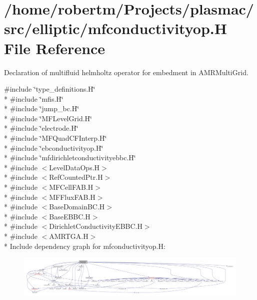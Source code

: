 \hypertarget{mfconductivityop_8H}{}\section{/home/robertm/\+Projects/plasmac/src/elliptic/mfconductivityop.H File Reference}
\label{mfconductivityop_8H}


Declaration of multifluid helmholtz operator for embedment in A\+M\+R\+Multi\+Grid.  


{\ttfamily \#include \char`\"{}type\+\_\+definitions.\+H\char`\"{}}\\*
{\ttfamily \#include \char`\"{}mfis.\+H\char`\"{}}\\*
{\ttfamily \#include \char`\"{}jump\+\_\+bc.\+H\char`\"{}}\\*
{\ttfamily \#include \char`\"{}M\+F\+Level\+Grid.\+H\char`\"{}}\\*
{\ttfamily \#include \char`\"{}electrode.\+H\char`\"{}}\\*
{\ttfamily \#include \char`\"{}M\+F\+Quad\+C\+F\+Interp.\+H\char`\"{}}\\*
{\ttfamily \#include \char`\"{}ebconductivityop.\+H\char`\"{}}\\*
{\ttfamily \#include \char`\"{}mfdirichletconductivityebbc.\+H\char`\"{}}\\*
{\ttfamily \#include $<$Level\+Data\+Ops.\+H$>$}\\*
{\ttfamily \#include $<$Ref\+Counted\+Ptr.\+H$>$}\\*
{\ttfamily \#include $<$M\+F\+Cell\+F\+A\+B.\+H$>$}\\*
{\ttfamily \#include $<$M\+F\+Flux\+F\+A\+B.\+H$>$}\\*
{\ttfamily \#include $<$Base\+Domain\+B\+C.\+H$>$}\\*
{\ttfamily \#include $<$Base\+E\+B\+B\+C.\+H$>$}\\*
{\ttfamily \#include $<$Dirichlet\+Conductivity\+E\+B\+B\+C.\+H$>$}\\*
{\ttfamily \#include $<$A\+M\+R\+T\+G\+A.\+H$>$}\\*
Include dependency graph for mfconductivityop.\+H\+:\nopagebreak
\begin{figure}[H]
\begin{center}
\leavevmode
\includegraphics[width=350pt]{mfconductivityop_8H__incl}
\end{center}
\end{figure}
